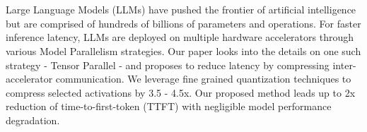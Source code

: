 \chapter{\abstractname}

Large Language Models (LLMs) have pushed the frontier of artificial intelligence but are comprised of hundreds of billions of parameters and operations. For faster inference latency, LLMs are deployed on multiple hardware accelerators through various Model Parallelism strategies. Our paper looks into the details on one such strategy - Tensor Parallel - and proposes to reduce latency by compressing inter-accelerator communication. We leverage fine grained quantization techniques to compress selected activations by 3.5 - 4.5x. Our proposed method leads up to 2x reduction of time-to-first-token (TTFT) with negligible model performance
degradation.
